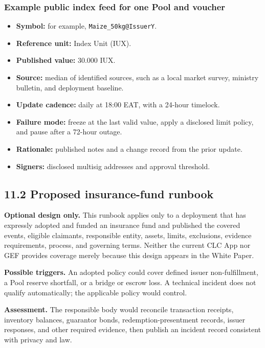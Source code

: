 \documentclass[11pt]{article}
\begin{document}
\subsubsection*{Example public index feed for one Pool and voucher}

\begin{itemize}[leftmargin=*]
\item \textbf{Symbol:} for example, \texttt{Maize\_50kg@IssuerY}.
\item \textbf{Reference unit:} Index Unit (IUX).
\item \textbf{Published value:} 30.000 IUX.
\item \textbf{Source:} median of identified sources, such as a local market survey, ministry bulletin, and deployment baseline.
\item \textbf{Update cadence:} daily at 18:00 EAT, with a 24-hour timelock.
\item \textbf{Failure mode:} freeze at the last valid value, apply a disclosed limit policy, and pause after a 72-hour outage.
\item \textbf{Rationale:} published notes and a change record from the prior update.
\item \textbf{Signers:} disclosed multisig addresses and approval threshold.
\end{itemize}
\subsection*{11.2 Proposed insurance-fund runbook}

\textbf{Optional design only.} This runbook applies only to a deployment that has expressly adopted and funded an insurance fund and published the covered events, eligible claimants, responsible entity, assets, limits, exclusions, evidence requirements, process, and governing terms. Neither the current CLC App nor GEF provides coverage merely because this design appears in the White Paper.

\textbf{Possible triggers.} An adopted policy could cover defined issuer non-fulfillment, a Pool reserve shortfall, or a bridge or escrow loss. A technical incident does not qualify automatically; the applicable policy would control.

\textbf{Assessment.} The responsible body would reconcile transaction receipts, inventory balances, guarantor bonds, redemption-presentment records, issuer responses, and other required evidence, then publish an incident record consistent with privacy and law.
\end{document}
